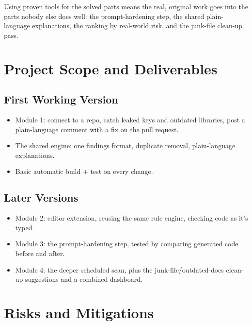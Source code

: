 \documentclass[12pt,a4paper]{article}
\begin{document}
Using proven tools for the solved parts means the real, original work goes into the parts nobody else does well: the prompt-hardening step, the shared plain-language explanations, the ranking by real-world risk, and the junk-file clean-up pass.

\section{Project Scope and Deliverables}

\subsection{First Working Version}

\begin{itemize}
    \item Module 1: connect to a repo, catch leaked keys and outdated libraries, post a plain-language comment with a fix on the pull request.

    \item The shared engine: one findings format, duplicate removal, plain-language explanations.

    \item Basic automatic build + test on every change.
\end{itemize}

\subsection{Later Versions}

\begin{itemize}
    \item Module 2: editor extension, reusing the same rule engine, checking code as it's typed.

    \item Module 3: the prompt-hardening step, tested by comparing generated code before and after.

    \item Module 4: the deeper scheduled scan, plus the junk-file/outdated-docs clean-up suggestions and a combined dashboard.
\end{itemize}

\section{Risks and Mitigations}
\end{document}
